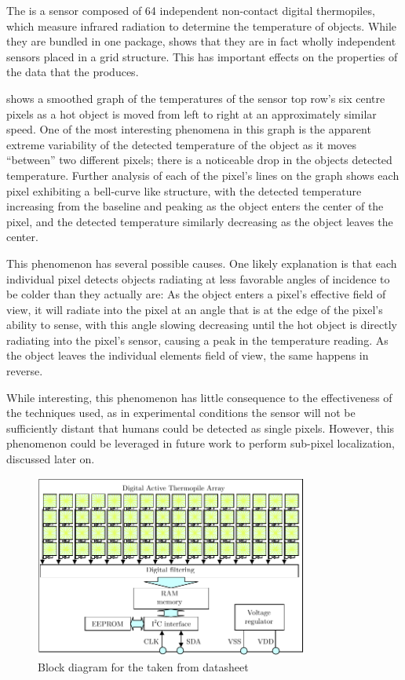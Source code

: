 \documentclass[../thesis/thesis.tex]{subfiles}
\begin{document}
The \mlx is a sensor composed of 64 independent non-contact digital thermopiles, which measure infrared radiation to determine the temperature of objects. While they are bundled in one package,  shows that they are in fact wholly independent sensors placed in a grid structure. This has important effects on the properties of the data that the \mlx produces. 

 shows a smoothed graph of the temperatures of the sensor top row's six centre pixels as a hot object is moved from left to right at an approximately similar speed. One of the most interesting phenomena in this graph is the apparent extreme variability of the detected temperature of the object as it moves ``between'' two different pixels; there is a noticeable drop in the objects detected temperature. Further analysis of each of the pixel's lines on the graph shows each pixel exhibiting a bell-curve like structure, with the detected temperature increasing from the baseline and peaking as the object enters the center of the pixel, and the detected temperature similarly decreasing as the object leaves the center. 

This phenomenon has several possible causes. One likely explanation is that each individual pixel detects objects radiating at less favorable angles of incidence to be colder than they actually are: As the object enters a pixel's effective field of view, it will radiate into the pixel at an angle that is at the edge of the pixel's ability to sense, with this angle slowing decreasing until the hot object is directly radiating into the pixel's sensor, causing a peak in the temperature reading. As the object leaves the individual elements field of view, the same happens in reverse.

While interesting, this phenomenon has little consequence to the effectiveness of the techniques used, as in experimental conditions the sensor will not be sufficiently distant that humans could be detected as single pixels. However, this phenomenon could be leveraged in future work to perform sub-pixel localization, discussed later on.


\begin{figure}
\centering
\includegraphics[width=0.8\textwidth]{../diagrams/mlx-block-diagram.pdf}
\caption{Block diagram for the \mlx taken from datasheet \cite{MLXDatasheet}}
\label{fig:exps:blockdia}
\end{figure}
\end{document}
